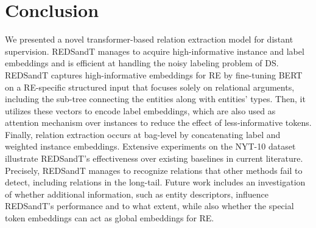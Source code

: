 \documentclass[11pt,a4paper]{article}
\begin{document}
\section{Conclusion}
\label{sect:conclusion}
We presented a novel transformer-based relation extraction model for distant supervision. REDSandT manages to acquire high-informative instance and label embeddings and is efficient at handling the noisy labeling problem of DS. REDSandT captures high-informative embeddings for RE by fine-tuning BERT on a RE-specific structured input that focuses solely on relational arguments, including the sub-tree connecting the entities along with entities' types. Then, it utilizes these vectors to encode label embeddings, which are also used as attention mechanism over instances to reduce the effect of less-informative tokens. Finally, relation extraction occurs at bag-level by concatenating label and weighted instance embeddings. 
Extensive experiments on the NYT-10 dataset illustrate REDSandT's effectiveness over existing baselines in current literature. Precisely, REDSandT manages to recognize relations that other methods fail to detect, including relations in the long-tail.
Future work includes an investigation of whether additional information, such as entity descriptors, influence REDSandT's performance and to what extent, while also whether the special token embeddings can act as global embeddings for RE.
\end{document}
